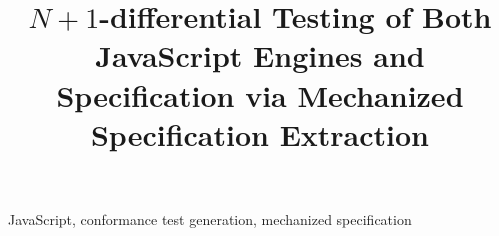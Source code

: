\documentclass[10pt,conference]{IEEEtran}
\begin{document}
\title{$N\!+\!1$-differential Testing of Both JavaScript Engines and
Specification via Mechanized Specification Extraction}




\author{
}

% 
% 
% 
% 
% 
% 

\maketitle



\begin{IEEEkeywords}
JavaScript, conformance test generation, mechanized specification
\end{IEEEkeywords}










\end{document}
